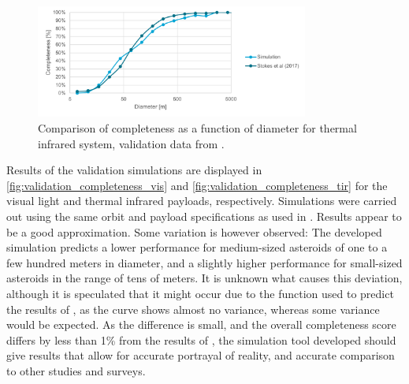 \begin{figure}[htbp]
 \centering
 \includegraphics[width=0.8\textwidth]{img/validation_completeness_tir.pdf}
 \caption{Comparison of completeness as a function of diameter for thermal infrared system, validation data from \cite{2017NEOSDT}.}
 \label{fig:validation_completeness_tir}
\end{figure}

Results of the validation simulations are displayed in \autoref{fig:validation_completeness_vis} and \autoref{fig:validation_completeness_tir} for the visual light and thermal infrared payloads, respectively. Simulations were carried out using the same orbit and payload specifications as used in \cite{2017NEOSDT}. Results appear to be a good approximation. Some variation is however observed: The developed simulation predicts a lower performance for medium-sized asteroids of one to a few hundred meters in diameter, and a slightly higher performance for small-sized asteroids in the range of tens of meters. It is unknown what causes this deviation, although it is speculated that it might occur due to the function used to predict the results of \cite{2017NEOSDT}, as the curve shows almost no variance, whereas some variance would be expected. As the difference is small, and the overall completeness score differs by less than 1\% from the results of \cite{2017NEOSDT}, the simulation tool developed should give results that allow for accurate portrayal of reality, and accurate comparison to other studies and surveys.
